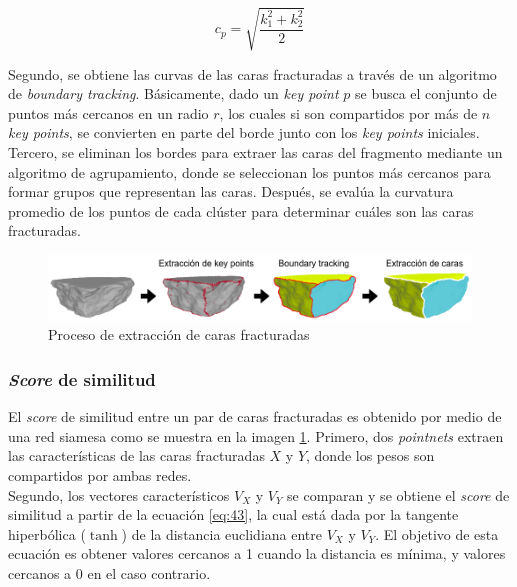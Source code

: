 \begin{equation} \label{eq:46}
    c_p = \sqrt{\frac{k_1^2 + k_2^2}{2}}
\end{equation}

Segundo, se obtiene las curvas de las caras fracturadas a través de un algoritmo de \textit{boundary tracking}. Básicamente, dado un \textit{key point} $p$ se busca el conjunto de puntos más cercanos en un radio $r$, los cuales si son compartidos por más de $n$ \textit{key points}, se convierten en parte del borde junto con los \textit{key points} iniciales. \\

Tercero, se eliminan los bordes para extraer las caras del fragmento mediante un algoritmo de agrupamiento, donde se seleccionan los puntos más cercanos para formar grupos que representan las caras. Después, se evalúa la curvatura promedio de los puntos de cada clúster para determinar cuáles son las caras fracturadas. 

\begin{figure}[!h]
    \centering
     \includegraphics[scale=0.35]{images/fracture.png}
    \caption{Proceso de extracción de caras fracturadas}
    \label{fig:siamesa}
\end{figure}


\subsubsection{\textit{Score} de similitud}
El \textit{score} de similitud entre un par de caras fracturadas es obtenido por medio de una red siamesa como se muestra en la imagen \ref{fig:siamesa}. Primero, dos \textit{pointnets} extraen las características de las caras fracturadas $X$ y $Y$, donde los pesos son compartidos por ambas redes.  \\

Segundo, los vectores característicos $V_{X}$ y $V_{Y}$ se comparan y se obtiene el \textit{score} de similitud a partir de la ecuación \ref{eq:43}, la cual está dada por la tangente hiperbólica ($\tanh$) de la distancia euclidiana entre $V_{X}$ y $V_{Y}$. El objetivo de esta ecuación es obtener valores cercanos a 1 cuando la distancia es mínima, y valores cercanos a 0 en el caso contrario.


